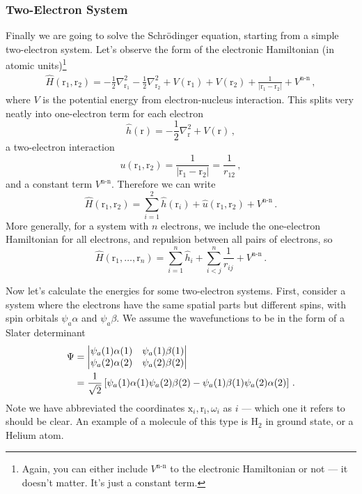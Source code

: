 \documentclass{article}
\theoremstyle{plain}\theoremheaderfont{\normalfont\itshape}\theorembodyfont{\rmfamily}\theoremseparator{.}\newtheorem*{rem}{Remark}\newtheorem*{ex}{Example}\newtheorem*{proof}{Proof}\newtheorem*{altp}{Alternative proof}
\theoremstyle{plain}\theoremheaderfont{\normalfont\bfseries}\theorembodyfont{\rmfamily}\theoremseparator{.}\newtheorem{thm}{Theorem}[section]\newtheorem{lem}[thm]{Lemma}\newtheorem{prop}[thm]{Proposition}\newtheorem*{cor}{Corollary}\newtheorem{defn}[thm]{Definition}\newtheorem{clm}[thm]{Claim}\newtheorem{clminproof}{Claim}\newtheorem{pos}{Postulate}[section]
\theoremstyle{break}\theoremheaderfont{\normalfont\itshape}\theorembodyfont{\rmfamily}\theoremseparator{.\medskip}\newtheorem*{proofskip}{Proof}\newtheorem*{exs}{Examples}\newtheorem*{rems}{Remarks}
\theoremstyle{break}\theoremheaderfont{\normalfont\bfseries}\theorembodyfont{\rmfamily}\theoremseparator{.\medskip}\newtheorem{lemskip}[thm]{Lemma}\newtheorem{defnskip}[thm]{Definition}\newtheorem{propskip}[thm]{Proposition}\newtheorem{thmskip}[thm]{Theorem}
\numberwithin{equation}{section}
\newcommand{\vb}[1]{\bm{\mathrm{#1}}}
\newcommand{\abs}[1]{\left| #1 \right|}
\newcommand{\laplacian}{\nabla^2}
\begin{document}
    \subsubsection{Two-Electron System}
    Finally we are going to solve the Schr\"{o}dinger equation, starting from a simple two-electron system. Let's observe the form of the electronic Hamiltonian (in atomic units)\footnote{Again, you can either include \(V^{\text{n-n}}\) to the electronic Hamiltonian or not --- it doesn't matter. It's just a constant term.}
    \begin{eqnarray}
        \hat{H}(\vb{r}_1,\vb{r}_2)=-\frac{1}{2}\laplacian_{\vb{r}_1}-\frac{1}{2}\laplacian_{\vb{r}_2}+V(\vb{r}_1)+V(\vb{r}_2)+\frac{1}{\abs{\vb{r}_1-\vb{r}_2}}+V^{\text{n-n}}\,,
    \end{eqnarray}
    where \(V\) is the potential energy from electron-nucleus interaction. This splits very neatly into one-electron term for each electron
    \begin{equation}
        \hat{h}(\vb{r})=-\frac{1}{2}\laplacian_{\vb{r}}+V(\vb{r})\,,
    \end{equation}
    a two-electron interaction
    \begin{equation}
        u(\vb{r}_1,\vb{r}_2)=\frac{1}{\abs{\vb{r}_1-\vb{r}_2}}=\frac{1}{r_{12}}\,,
    \end{equation}
    and a constant term \(V^{\text{n-n}}\). Therefore we can write
    \begin{equation}
        \hat{H}(\vb{r}_1,\vb{r}_2)=\sum_{i=1}^{2}\hat{h}(\vb{r}_i)+\hat{u}(\vb{r}_1,\vb{r}_2)+V^{\text{n-n}}\,.
    \end{equation}
    More generally, for a system with \(n\) electrons, we include the one-electron Hamiltonian for all electrons, and repulsion between all pairs of electrons, so
    \begin{equation}
        \hat{H}(\vb{r}_1,\dots,\vb{r}_n)=\sum_{i=1}^{n}\hat{h}_i+\sum_{i<j}^{n}\frac{1}{r_{ij}}+V^{\text{n-n}}\,.
    \end{equation}

    Now let's calculate the energies for some two-electron systems. First, consider a system where the electrons have the same spatial parts but different spins, with spin orbitals \(\psi_a\alpha\) and \(\psi_a\beta\). We assume the wavefunctions to be in the form of a Slater determinant
    \begin{align}
        \Psi&=\begin{vmatrix}
            \psi_a(1)\alpha(1) & \psi_a(1)\beta(1) \\
            \psi_a(2)\alpha(2) & \psi_a(2)\beta(2)
        \end{vmatrix}\notag\\
        &=\frac{1}{\sqrt{2}}\left[\psi_a(1)\alpha(1)\psi_a(2)\beta(2)-\psi_a(1)\beta(1)\psi_a(2)\alpha(2)\right]\,.
    \end{align}
    Note we have abbreviated the coordinates \(\vb{x}_i,\vb{r_i},\omega_i\) as \(i\) --- which one it refers to should be clear. An example of a molecule of this type is \(\mathrm{H_2}\) in ground state, or a Helium atom.
\end{document}
